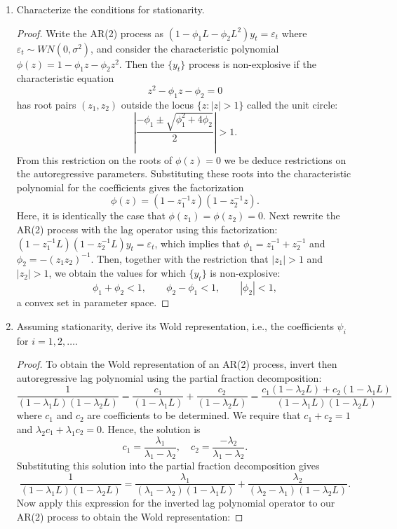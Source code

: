 \documentclass[oneside,reqno]{amsart}
\newcommand{\eps}{\varepsilon}
\theoremstyle{definition}
\begin{document}
\begin{enumerate}
\item
Characterize the conditions for stationarity. 
\begin{proof}
Write the AR(2) process as $(1 - \phi_1 L -  \phi_2 L^2)y_t =  \eps_t$ where $\eps_t \sim WN(0, \sigma^2)$, and consider the characteristic polynomial $\phi(z) = 1 - \phi_1 z - \phi_2 z^2$. Then the $\{y_t\}$ process is non-explosive if the characteristic equation 
\[
	z^2 -\phi_1 z - \phi_2 = 0
\]
has root pairs $(z_1,z_2)$ outside the locus $\{z : |z| > 1\}$ called the unit circle:
\[
	\left| \frac{-\phi_1 \pm \sqrt{\phi_1^2 + 4\phi_2}}{2} \right| > 1.
\]
From this restriction on the roots of $\phi(z)=0$ we be deduce restrictions on the autoregressive parameters. Substituting these roots into the characteristic polynomial for the coefficients gives the factorization 
\[
	\phi(z) = (1- z_1^{-1}z)(1- z_2^{-1}z).
\]
Here, it is identically the case that $\phi(z_1) = \phi(z_2) = 0$. Next rewrite the AR(2) process with the lag operator using this factorization: $(1- z_1^{-1}L)(1- z_2^{-1}L)y_t = \eps_t$, which implies that $\phi_1 = z_1^{-1}+ z_2^{-1}$ and $\phi_2 =-(z_1z_2)^{-1}$. Then, together with the restriction that $|z_1| > 1$ and $|z_2|>1$, we obtain the values for which $\{y_t\}$ is non-explosive:
\[
	\phi_1 + \phi_2 < 1, \qquad \phi_2 - \phi_1 < 1, \qquad |\phi_2| < 1,
\]
a convex set in parameter space. 
\end{proof}
\item
Assuming stationarity, derive its Wold representation, i.e., the coefficients $\psi_i$ for $i=1,2,\dotsc$.
\begin{proof}
To obtain the Wold representation of an AR(2) process, invert then autoregressive lag polynomial using the partial fraction decomposition:
\[
	\frac{1}{(1-\lambda_1 L ) (1-\lambda_2 L)} = \frac{c_1}{(1-\lambda_1 L )} + \frac{c_2}{(1-\lambda_2 L)} = \frac{c_1(1-\lambda_2 L) + c_2 (1-\lambda_1 L)}{(1-\lambda_1 L ) (1-\lambda_2 L)}
\]
where $c_1$ and $c_2$ are coefficients to be determined. We require that $c_1 + c_2 = 1$ and $\lambda_2 c_1 + \lambda_1 c_2 = 0$. Hence, the solution is 
\[
	c_1 = \frac{\lambda_1}{\lambda_1 - \lambda_2}, \quad c_2 = \frac{-\lambda_2}{\lambda_1 - \lambda_2}.
\]
Substituting this solution into the partial fraction decomposition gives  
\[
	\frac{1}{(1-\lambda_1 L ) (1-\lambda_2 L)} = 	\frac{\lambda_1}{(\lambda_1 -\lambda_2) (1-\lambda_1 L)} 
+ \frac{\lambda_2}{(\lambda_2 -\lambda_1) (1-\lambda_2 L)}.
\]
Now apply this expression for the inverted lag polynomial operator to our AR(2) process to obtain the Wold representation:

\end{proof}
\end{enumerate}
\end{document}
